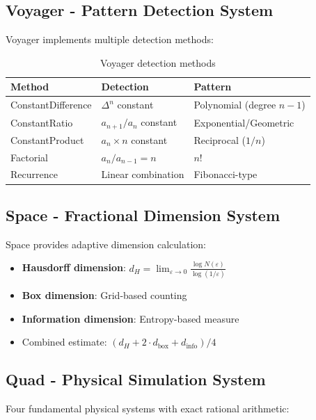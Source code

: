 \documentclass[11pt,a4paper]{article}
\begin{document}
\subsection{Voyager - Pattern Detection System}

Voyager implements multiple detection methods:

\begin{table}[h]
\centering
\begin{tabular}{|l|l|l|}
\hline
\textbf{Method} & \textbf{Detection} & \textbf{Pattern} \\
\hline
ConstantDifference & $\Delta^n$ constant & Polynomial (degree $n-1$) \\
ConstantRatio & $a_{n+1}/a_n$ constant & Exponential/Geometric \\
ConstantProduct & $a_n \times n$ constant & Reciprocal ($1/n$) \\
Factorial & $a_n/a_{n-1} = n$ & $n!$ \\
Recurrence & Linear combination & Fibonacci-type \\
\hline
\end{tabular}
\caption{Voyager detection methods}
\end{table}

\subsection{Space - Fractional Dimension System}

Space provides adaptive dimension calculation:
\begin{itemize}
    \item \textbf{Hausdorff dimension}: $d_H = \lim_{\varepsilon \to 0} \frac{\log N(\varepsilon)}{\log(1/\varepsilon)}$
    \item \textbf{Box dimension}: Grid-based counting
    \item \textbf{Information dimension}: Entropy-based measure
    \item Combined estimate: $(d_H + 2 \cdot d_{\text{box}} + d_{\text{info}}) / 4$
\end{itemize}

\subsection{Quad - Physical Simulation System}

Four fundamental physical systems with exact rational arithmetic:
\end{document}

